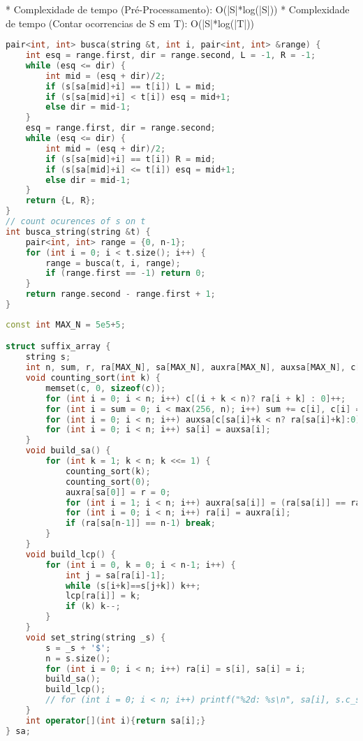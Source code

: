 \documentclass[11pt, a4paper, twoside]{article}
\begin{document}
* Complexidade de tempo (Pré-Processamento): O(|S|*log(|S|))
* Complexidade de tempo (Contar ocorrencias de S em T): O(|S|*log(|T|))
\begin{lstlisting}[language=C++]
pair<int, int> busca(string &t, int i, pair<int, int> &range) {
    int esq = range.first, dir = range.second, L = -1, R = -1;
    while (esq <= dir) {
        int mid = (esq + dir)/2;
        if (s[sa[mid]+i] == t[i]) L = mid;
        if (s[sa[mid]+i] < t[i]) esq = mid+1;
        else dir = mid-1; 
    }
    esq = range.first, dir = range.second;
    while (esq <= dir) {
        int mid = (esq + dir)/2;
        if (s[sa[mid]+i] == t[i]) R = mid;
        if (s[sa[mid]+i] <= t[i]) esq = mid+1;
        else dir = mid-1; 
    }
    return {L, R};
}
// count ocurences of s on t
int busca_string(string &t) {
    pair<int, int> range = {0, n-1};
    for (int i = 0; i < t.size(); i++) {
        range = busca(t, i, range);
        if (range.first == -1) return 0;
    }
    return range.second - range.first + 1;
}\end{lstlisting}

\begin{lstlisting}[language=C++]
const int MAX_N = 5e5+5;

struct suffix_array {
    string s;
    int n, sum, r, ra[MAX_N], sa[MAX_N], auxra[MAX_N], auxsa[MAX_N], c[MAX_N], lcp[MAX_N];
    void counting_sort(int k) {
        memset(c, 0, sizeof(c));
        for (int i = 0; i < n; i++) c[(i + k < n)? ra[i + k] : 0]++;
        for (int i = sum = 0; i < max(256, n); i++) sum += c[i], c[i] = sum - c[i];
        for (int i = 0; i < n; i++) auxsa[c[sa[i]+k < n? ra[sa[i]+k]:0]++] = sa[i];
        for (int i = 0; i < n; i++) sa[i] = auxsa[i];
    }
    void build_sa() {
        for (int k = 1; k < n; k <<= 1) {
            counting_sort(k);
            counting_sort(0);
            auxra[sa[0]] = r = 0;
            for (int i = 1; i < n; i++) auxra[sa[i]] = (ra[sa[i]] == ra[sa[i-1]] && ra[sa[i]+k] == ra[sa[i-1]+k])? r:++r;
            for (int i = 0; i < n; i++) ra[i] = auxra[i];
            if (ra[sa[n-1]] == n-1) break;
        }
    }
    void build_lcp() {
        for (int i = 0, k = 0; i < n-1; i++) {
            int j = sa[ra[i]-1];
            while (s[i+k]==s[j+k]) k++;
            lcp[ra[i]] = k;
            if (k) k--;
        }
    }
    void set_string(string _s) {
        s = _s + '$';
        n = s.size();
        for (int i = 0; i < n; i++) ra[i] = s[i], sa[i] = i;
        build_sa();
        build_lcp();
        // for (int i = 0; i < n; i++) printf("%2d: %s\n", sa[i], s.c_str() + sa[i]);
    }
    int operator[](int i){return sa[i];}
} sa;
\end{lstlisting}
\end{document}
